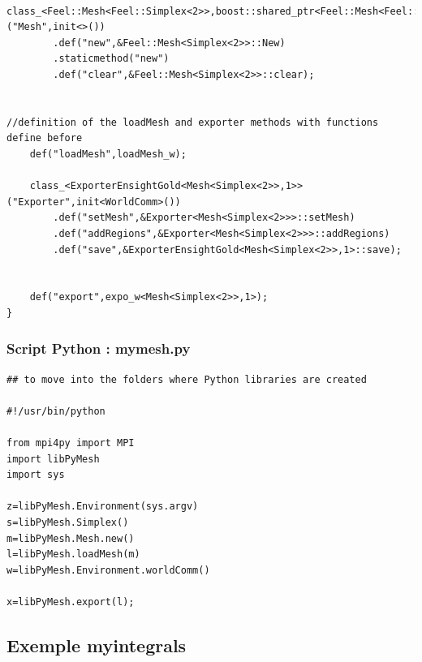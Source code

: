 \documentclass[french,12pt]{article}
\begin{document}
\begin{lstlisting}
    class_<Feel::Mesh<Feel::Simplex<2>>,boost::shared_ptr<Feel::Mesh<Feel::Simplex<2>>>,boost::noncopyable>("Mesh",init<>())
        .def("new",&Feel::Mesh<Simplex<2>>::New)
        .staticmethod("new")
        .def("clear",&Feel::Mesh<Simplex<2>>::clear);


//definition of the loadMesh and exporter methods with functions define before 
    def("loadMesh",loadMesh_w);

    class_<ExporterEnsightGold<Mesh<Simplex<2>>,1>>("Exporter",init<WorldComm>())
        .def("setMesh",&Exporter<Mesh<Simplex<2>>>::setMesh) 
        .def("addRegions",&Exporter<Mesh<Simplex<2>>>::addRegions)
        .def("save",&ExporterEnsightGold<Mesh<Simplex<2>>,1>::save);


    def("export",expo_w<Mesh<Simplex<2>>,1>);
}
\end{lstlisting}
\subsubsection{Script Python : mymesh.py}
\begin{lstlisting}
## to move into the folders where Python libraries are created

#!/usr/bin/python

from mpi4py import MPI
import libPyMesh
import sys

z=libPyMesh.Environment(sys.argv)
s=libPyMesh.Simplex()
m=libPyMesh.Mesh.new()
l=libPyMesh.loadMesh(m)
w=libPyMesh.Environment.worldComm()

x=libPyMesh.export(l);
\end{lstlisting}

\subsection{Exemple myintegrals}
\end{document}

